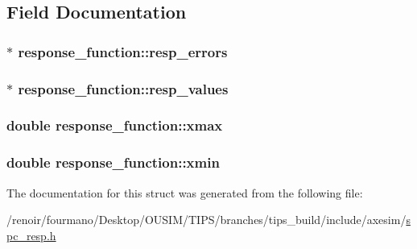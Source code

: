 \subsection{Field Documentation}
\hypertarget{structresponse__function_a4a8113d578a58810c2d396bd2ea31920}{
\subsubsection[{resp\_\-errors}]{$\ast$ {\bf response\_\-function::resp\_\-errors}}}
\label{structresponse__function_a4a8113d578a58810c2d396bd2ea31920}
\hypertarget{structresponse__function_a67e56fb3a2affd39926091ff4fd57d5a}{
\subsubsection[{resp\_\-values}]{$\ast$ {\bf response\_\-function::resp\_\-values}}}
\label{structresponse__function_a67e56fb3a2affd39926091ff4fd57d5a}
\hypertarget{structresponse__function_a5af3cf2a845502be139d4ecfb620c731}{
\subsubsection[{xmax}]{\setlength{\rightskip}{0pt plus 5cm}double {\bf response\_\-function::xmax}}}
\label{structresponse__function_a5af3cf2a845502be139d4ecfb620c731}
\hypertarget{structresponse__function_a75d90be05a1402c3afe4563a16289160}{
\subsubsection[{xmin}]{\setlength{\rightskip}{0pt plus 5cm}double {\bf response\_\-function::xmin}}}
\label{structresponse__function_a75d90be05a1402c3afe4563a16289160}


The documentation for this struct was generated from the following file:\begin{DoxyCompactItemize}
\item 
/renoir/fourmano/Desktop/OUSIM/TIPS/branches/tips\_\-build/include/axesim/\hyperlink{spc__resp_8h}{spc\_\-resp.h}\end{DoxyCompactItemize}
